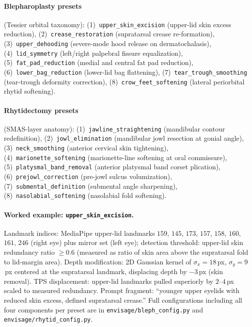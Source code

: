 \documentclass{article}
\begin{document}
\paragraph{Blepharoplasty presets} (Tessier orbital taxonomy):
(1)~\texttt{upper\_skin\_excision} (upper-lid skin excess reduction),
(2)~\texttt{crease\_restoration} (supratarsal crease re-formation),
(3)~\texttt{upper\_dehooding} (severe-mode hood release on dermatochalasis),
(4)~\texttt{lid\_symmetry} (left/right palpebral fissure equalization),
(5)~\texttt{fat\_pad\_reduction} (medial and central fat pad reduction),
(6)~\texttt{lower\_bag\_reduction} (lower-lid bag flattening),
(7)~\texttt{tear\_trough\_smoothing} (tear-trough deformity correction),
(8)~\texttt{crow\_feet\_softening} (lateral periorbital rhytid softening).

\paragraph{Rhytidectomy presets} (SMAS-layer anatomy):
(1)~\texttt{jawline\_straightening} (mandibular contour redefinition),
(2)~\texttt{jowl\_elimination} (mandibular jowl resection at gonial angle),
(3)~\texttt{neck\_smoothing} (anterior cervical skin tightening),
(4)~\texttt{marionette\_softening} (marionette-line softening at oral
commissure), (5)~\texttt{platysmal\_band\_removal} (anterior platysmal
band corset plication), (6)~\texttt{prejowl\_correction} (pre-jowl sulcus
volumization), (7)~\texttt{submental\_definition} (submental angle
sharpening), (8)~\texttt{nasolabial\_softening} (nasolabial fold
softening).

\paragraph{Worked example: \texttt{upper\_skin\_excision}.}
Landmark indices: MediaPipe upper-lid landmarks $159$, $145$, $173$, $157$,
$158$, $160$, $161$, $246$ (right eye) plus mirror set (left eye); detection
threshold: upper-lid skin redundancy ratio $\geq 0.6$ (measured as ratio
of skin area above the supratarsal fold to lid-margin area). Depth
modification: 2D Gaussian kernel of $\sigma_x{=}18$\,px, $\sigma_y{=}9$\,px
centered at the supratarsal landmark, displacing depth by $-3$\,px (skin
removal). TPS displacement: upper-lid landmarks pulled superiorly by
$2$--$4$\,px scaled to measured redundancy. Prompt fragment: ``younger
upper eyelids with reduced skin excess, defined supratarsal crease.''
Full configurations including all four components per preset are in
\texttt{envisage/bleph\_config.py} and \texttt{envisage/rhytid\_config.py}.
\end{document}
